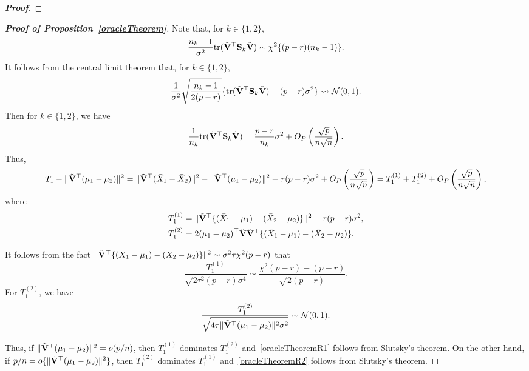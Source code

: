 \documentclass[times,sort&compress,3p]{elsarticle}
\newcommand{\mytr}{ {\rm tr} }
\theoremstyle{plain}
\theoremstyle{definition}
\theoremstyle{remark}
\begin{document}
\begin{appendices}
\begin{proof}[\textbf{Proof}]
\end{proof}


\begin{proof}[\textbf{Proof of Proposition~\ref{oracleTheorem}}]
    Note that, for $k\in\{1,2\}$,
    $$
    \frac{n_k-1}{\sigma^2} \mytr(\tilde{\BV}^\top  \BS_k \tilde{\BV})\sim \chi^2\{(p-r)(n_k-1)\}.
    $$
    It follows from the central limit theorem that, for $k\in\{1,2\}$,
    \begin{equation*}
        \frac{1}{\sigma^2}\sqrt{\frac{n_k-1}{2(p-r)}}\{ \mytr(\tilde{\BV}^\top  \BS_k \tilde{\BV})-(p-r)\sigma^2\}\rightsquigarrow \mathcal{N}(0,1).
    \end{equation*}
    Then for $k\in\{1,2\}$, we have
    $$
           \frac{1}{n_k} \mytr(\tilde{\BV}^\top  \BS_k \tilde{\BV}) =
            \frac{p-r}{n_k}\sigma^2 + O_P\left(\frac{\sqrt{p}}{n\sqrt{n}}\right).
    $$
    Thus,
    \begin{equation*}
            T_1-\|\tilde{\mathbf{V}}^\top (\mu_1-\mu_2)\|^2=
            \|\tilde{\mathbf{V}}^\top (\bar{X}_1-\bar{X}_2)\|^2-
            \|\tilde{\mathbf{V}}^\top (\mu_1-\mu_2)\|^2
            -  \tau (p-r)\sigma^2 + O_P\left(\frac{\sqrt{p}}{n\sqrt{n}}\right)
            =
            T_1^{(1)}+T_1^{(2)}
            + O_P\left(\frac{\sqrt{p}}{n\sqrt{n}}\right)
            ,
    \end{equation*}
    where
    \begin{align*}
        T_1^{(1)}&=\|\tilde{\mathbf{V}}^\top \{(\bar{X}_1-\mu_1)-(\bar{X}_2-\mu_2)\}\|^2   -  \tau (p-r)\sigma^2, \\
        T_1^{(2)}&=2{(\mu_1-\mu_2)}^\top \tilde{\mathbf{V}}\tilde{\mathbf{V}}^\top \{(\bar{X}_1-\mu_1)-(\bar{X}_2-\mu_2) \}.
    \end{align*}

It follows from the fact
$\|\tilde{\mathbf{V}}^\top  \{ (\bar{X}_1-\mu_1)-(\bar{X}_2-\mu_2) \}\|^2\sim \sigma^2\tau\chi^2(p-r)$ that
$$
            \frac{T_1^{(1)}}{\sqrt{2\tau^2 (p-r)\sigma^4}}\sim \frac{\chi^2 (p-r)- (p-r)}{\sqrt{2(p-r)}}.
    $$
    For $T_1^{(2)}$, we have
    \begin{equation*}
            \frac{T_1^{(2)}}{\sqrt{4\tau \|\tilde{\mathbf{V}}^\top (\mu_1-\mu_2)\|^2\sigma^2}}
            \sim \mathcal{N}(0,1).
    \end{equation*}

    Thus, if $\|\tilde{\mathbf{V}}^\top  (\mu_1-\mu_2)\|^2=o(p/n)$, then $T_1^{(1)}$ dominates $T_1^{(2)}$ and~\eqref{oracleTheoremR1} follows from Slutsky's theorem.
    On the other hand, if  $p/n= o\{\|\tilde{\mathbf{V}}^\top (\mu_1-\mu_2)\|^2\}$, then $T_1^{(2)}$ dominates $T_1^{(1)}$ and~\eqref{oracleTheoremR2} follows from Slutsky's theorem.
\end{proof}




\end{appendices}
\end{document}
